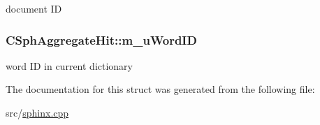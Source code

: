 document I\-D 

\hypertarget{structCSphAggregateHit_aebbf4230647af0e336746ce7dcc9e77c}{
\subsubsection[{m\-\_\-u\-Word\-I\-D}]{ C\-Sph\-Aggregate\-Hit\-::m\-\_\-u\-Word\-I\-D}}\label{structCSphAggregateHit_aebbf4230647af0e336746ce7dcc9e77c}


word I\-D in current dictionary 



The documentation for this struct was generated from the following file\-:\begin{DoxyCompactItemize}
\item 
src/\hyperlink{sphinx_8cpp}{sphinx.\-cpp}\end{DoxyCompactItemize}
